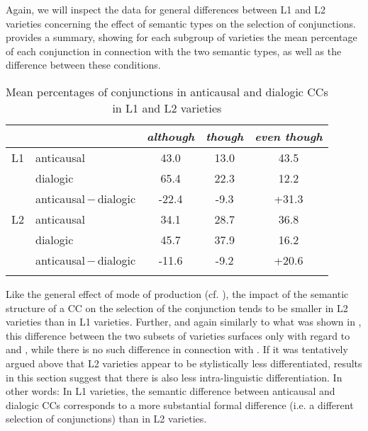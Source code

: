 Again, we will inspect the data for general differences between L1 and L2 varieties concerning the effect of semantic types on the selection of conjunctions.  provides a summary, showing for each subgroup of varieties the mean percentage of each conjunction in connection with the two semantic types, as well as the difference between these conditions.

\vfill
\begin{table}[H]
\caption{\label{bkm:Ref60005374}\label{tab:10.2}Mean percentages of conjunctions in anticausal and dialogic CCs in L1 and L2 varieties}
\begin{tabular}{ll *3{S[table-format=-2.1]}}
\lsptoprule
   &  & {\itshape although} & {\itshape though} & {\itshape even though}\\\midrule
L1 & anticausal & 43.0 & 13.0 & 43.5\\
   & dialogic & 65.4 & 22.3 & 12.2\\
   & anticausal\,$-$\,dialogic & -22.4 & -9.3 & +31.3\\\midrule
L2 & anticausal & 34.1 & 28.7 & 36.8\\
   & dialogic & 45.7 & 37.9 & 16.2\\
   & anticausal\,$-$\,dialogic & -11.6 & -9.2 & +20.6\\
\lspbottomrule
\end{tabular}
\end{table}
\vfill\pagebreak

Like the general effect of mode of production (cf. ), the impact of the semantic structure of a CC on the selection of the conjunction tends to be smaller in L2 varieties than in L1 varieties. Further, and again similarly to what was shown in , this difference between the two subsets of varieties surfaces only with regard to  and , while there is no such difference in connection with . If it was tentatively argued above that L2 varieties appear to be stylistically less differentiated, results in this section suggest that there is also less intra-linguistic differentiation. In other words: In L1 varieties, the semantic difference between anticausal and dialogic CCs corresponds to a more substantial formal difference (i.e. a different selection of conjunctions) than in L2 varieties.

